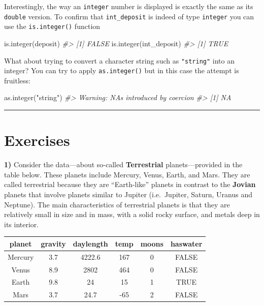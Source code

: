 \documentclass[
]{book}
\newenvironment{Shaded}{\begin{snugshade}}{\end{snugshade}}
\newcommand{\CommentTok}[1]{\textcolor[rgb]{0.56,0.35,0.01}{\textit{#1}}}
\newcommand{\FunctionTok}[1]{\textcolor[rgb]{0.00,0.00,0.00}{#1}}
\newcommand{\NormalTok}[1]{#1}
\newcommand{\StringTok}[1]{\textcolor[rgb]{0.31,0.60,0.02}{#1}}
\begin{document}
Interestingly, the way an \texttt{integer} number is displayed is exactly the same
as its \texttt{double} version. To confirm that \texttt{int\_deposit} is indeed of type
\texttt{integer} you can use the \texttt{is.integer()} function

\begin{Shaded}
\begin{Highlighting}[]
\FunctionTok{is.integer}\NormalTok{(deposit)}
\CommentTok{\#\textgreater{} [1] FALSE}
\FunctionTok{is.integer}\NormalTok{(int\_deposit)}
\CommentTok{\#\textgreater{} [1] TRUE}
\end{Highlighting}
\end{Shaded}

What about trying to convert a character string such as \texttt{"string"} into an
integer? You can try to apply \texttt{as.integer()} but in this case the attempt is
fruitless:

\begin{Shaded}
\begin{Highlighting}[]
\FunctionTok{as.integer}\NormalTok{(}\StringTok{"string"}\NormalTok{)}
\CommentTok{\#\textgreater{} Warning: NAs introduced by coercion}
\CommentTok{\#\textgreater{} [1] NA}
\end{Highlighting}
\end{Shaded}

\begin{center}\rule{0.5\linewidth}{0.5pt}\end{center}

\hypertarget{exercises-2}{%
\section{Exercises}\label{exercises-2}}

\textbf{1)} Consider the data---about so-called \textbf{Terrestrial} planets---provided
in the table below. These planets include Mercury, Venus, Earth, and Mars. They
are called terrestrial because they are ``Earth-like'' planets in contrast to the
\textbf{Jovian} planets that involve planets similar to Jupiter (i.e.~Jupiter,
Saturn, Uranus and Neptune). The main characteristics of terrestrial planets is that they are relatively small in size and in mass, with a solid rocky surface,
and metals deep in its interior.

\begin{longtable}[]{@{}cccccc@{}}
\toprule
planet & gravity & daylength & temp & moons & haswater \\
\midrule
\endhead
Mercury & 3.7 & 4222.6 & 167 & 0 & FALSE \\
Venus & 8.9 & 2802 & 464 & 0 & FALSE \\
Earth & 9.8 & 24 & 15 & 1 & TRUE \\
Mars & 3.7 & 24.7 & -65 & 2 & FALSE \\
\bottomrule
\end{longtable}
\end{document}
